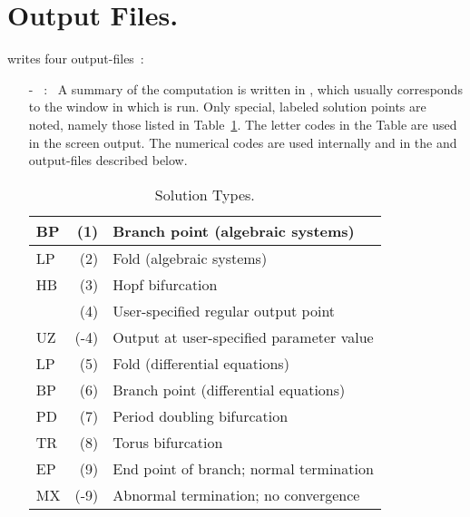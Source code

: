 \section{ Output Files.} \label{sec:Output_files}
\AUTO writes four output-files~:
\begin{itemize}
\item[-] ~:~
  A summary of the computation is written in , which usually
  corresponds to the window in which \AUTO is run. 
  Only special, labeled solution points are noted, namely those listed
  in Table~\ref{tbl:Solution_Types}.
  The letter codes in the Table are used in the screen output.
  The numerical codes are used internally and in
  the  and  output-files described below.

\begin{table}[htbp]
\begin{center}
\begin{tabular}{| l | r | l |}
\hline
 BP & (1)  & Branch point (algebraic systems) \\
\hline
 LP & (2)  & Fold (algebraic systems) \\
\hline
 HB & (3)  & Hopf bifurcation \\
\hline
  & (4)  & User-specified regular output point \\
\hline
 UZ & (-4)  & Output at user-specified parameter value \\
\hline
 LP & (5)  & Fold (differential equations) \\
\hline
 BP & (6)  & Branch point (differential equations) \\
\hline
 PD & (7)  & Period doubling bifurcation \\
\hline
 TR & (8)  & Torus bifurcation \\
\hline
 EP & (9)  & End point of branch; normal termination \\
\hline
 MX & (-9)  & Abnormal termination; no convergence \\
\hline
\end{tabular}
\caption{Solution Types.}
\label{tbl:Solution_Types}
\end{center}
\end{table}
 


\end{itemize}
